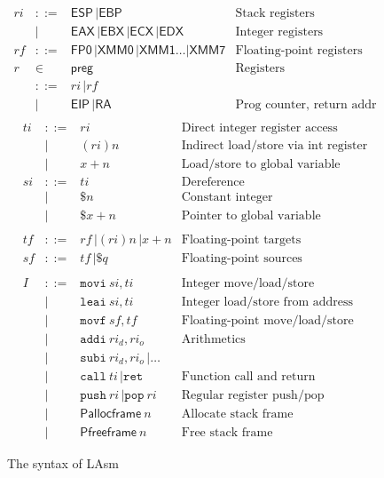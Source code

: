 \begin{figure}[t]\centering
\[
\begin{array}{llll}
\mathit{ri}  & ::= & \mathsf{ESP} \, | \mathsf{EBP} \, & \text{Stack registers} \\
& | & \mathsf{EAX} \, | \mathsf{EBX} \, | \mathsf{ECX} \, | \mathsf{EDX} & \text{Integer registers} \\
\mathit{rf} & ::= & \mathsf{FP0} \, | \mathsf{XMM0} \, | \mathsf{XMM1} \dots | \mathsf{XMM7} & \text{Floating-point registers} \\
r & \in & \textsf{preg} & \text{Registers} \\
 & ::= & \mathit{ri} \, | \mathit{rf} \\
& | & \mathsf{EIP} \, | \mathsf{RA} & \text{Prog counter, return addr} \\
\end{array}
\]
\[
\begin{array}{llll}
\mathit{ti} & ::= & \mathit{ri} & \text{Direct integer register access} \\
& | & (\mathit{ri})n & \text{Indirect load/store via int register} \\
& | & x+n & \text{Load/store to global variable} \\
\mathit{si} & ::= & \mathit{ti} & \text{Dereference} \\
& | & \$n & \text{Constant integer} \\
& | & \$x+n & \text{Pointer to global variable} \\
\\
\mathit{tf} & ::= & \mathit{rf} \, | (\mathit{ri})n \, | x+n & \text{Floating-point targets} \\
\mathit{sf} & ::= & \mathit{tf} \, | \$q \, & \text{Floating-point sources} \\
\\
\mathit{I} & ::= & \mathtt{movi} ~ \mathit{si}, \mathit{ti} & \text{Integer move/load/store} \\
& | & \mathtt{leai} ~ \mathit{si}, \mathit{ti} & \text{Integer load/store from address} \\
& | & \mathtt{movf} ~ \mathit{sf}, \mathit{tf} & \text{Floating-point move/load/store} \\
& | & \mathtt{addi} ~ \mathit{ri}_d, \mathit{ri}_o & \text{Arithmetics} \\
& | & \mathtt{subi} ~ \mathit{ri}_d, \mathit{ri}_o \, | \dots \\
& | & \mathtt{call} ~ \mathit{ti} \, | \mathtt{ret} & \text{Function call and return} \\
& | & \mathtt{push} ~ \mathit{ri} \, | \mathtt{pop} ~ \mathit{ri} & \text{Regular register push/pop} \\
& | & \mathsf{Pallocframe} ~ n & \text{Allocate stack frame} \\
& | & \mathsf{Pfreeframe} ~ n & \text{Free stack frame}
\end{array}
\]
\caption{The syntax of LAsm}
\label{fig:seq:lasm:syntax}
\hrulefill
\end{figure}

